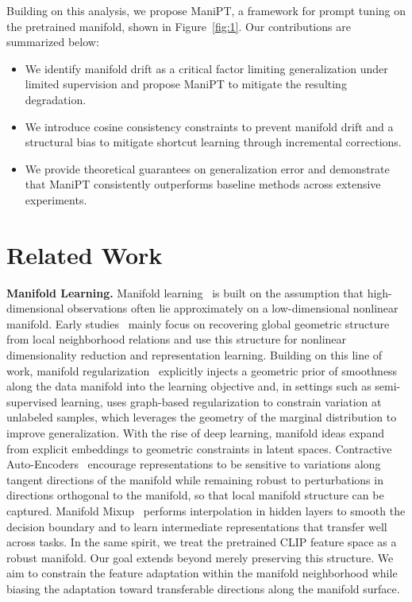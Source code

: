 \documentclass{article}
\theoremstyle{plain}
\theoremstyle{definition}
\theoremstyle{remark}
\begin{document}
	Building on this analysis, we propose ManiPT, a framework for prompt tuning on the pretrained manifold, shown in Figure~\ref{fig:1}. Our contributions are summarized below:
	\vspace{-10pt}
	\begin{itemize}
		\item We identify manifold drift as a critical factor limiting generalization under limited supervision and propose ManiPT to mitigate the resulting degradation.
		\item We introduce cosine consistency constraints to prevent manifold drift and a structural bias to mitigate shortcut learning through incremental corrections.
		\item We provide theoretical guarantees on generalization error and demonstrate that ManiPT consistently outperforms baseline methods across extensive experiments.
	\end{itemize}
	\vspace{-11pt}
	\section{Related Work}
	\textbf{Manifold Learning.} Manifold learning~\citep{tenenbaum2000global} is built on the assumption that high-dimensional observations often lie approximately on a low-dimensional nonlinear manifold. Early studies~\citep{roweis2000lle} mainly focus on recovering global geometric structure from local neighborhood relations and use this structure for nonlinear dimensionality reduction and representation learning. Building on this line of work, manifold regularization~\citep{belkin2006manifold} explicitly injects a geometric prior of smoothness along the data manifold into the learning objective and, in settings such as semi-supervised learning, uses graph-based regularization to constrain variation at unlabeled samples, which leverages the geometry of the marginal distribution to improve generalization. With the rise of deep learning, manifold ideas expand from explicit embeddings to geometric constraints in latent spaces. Contractive Auto-Encoders~\citep{rifai2011contractive} encourage representations to be sensitive to variations along tangent directions of the manifold while remaining robust to perturbations in directions orthogonal to the manifold, so that local manifold structure can be captured. Manifold Mixup~\citep{verma2019manifold} performs interpolation in hidden layers to smooth the decision boundary and to learn intermediate representations that transfer well across tasks. In the same spirit, we treat the pretrained CLIP feature space as a robust manifold. Our goal extends beyond merely preserving this structure. We aim to constrain the feature adaptation within the manifold neighborhood while biasing the adaptation toward transferable directions along the manifold surface.
	
\end{document}
